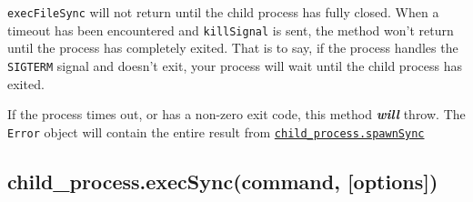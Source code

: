 \texttt{execFileSync} will not return until the child process has fully
closed. When a timeout has been encountered and \texttt{killSignal} is
sent, the method won't return until the process has completely exited.
That is to say, if the process handles the \texttt{SIGTERM} signal and
doesn't exit, your process will wait until the child process has exited.

If the process times out, or has a non-zero exit code, this method
\textbf{\emph{will}} throw. The \texttt{Error} object will contain the
entire result from
\hyperref[childux5fprocessux5fchildux5fprocessux5fspawnsyncux5fcommandux5fargsux5foptions]{\texttt{child\_process.spawnSync}}

\subsection{child\_process.execSync(command,
{[}options{]})}\label{childux5fprocess.execsynccommand-options}


